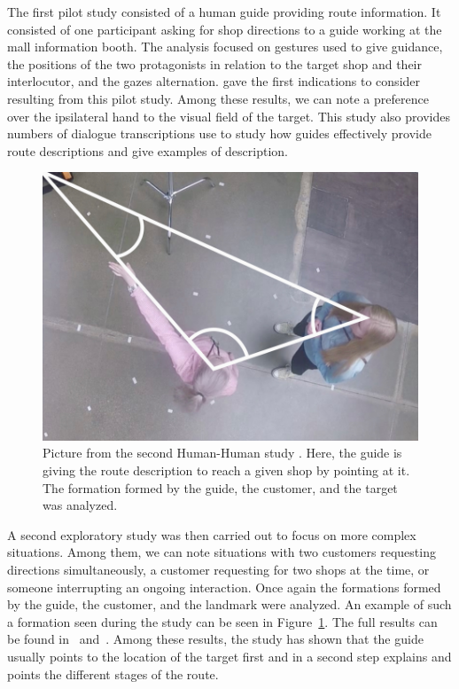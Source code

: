 The first pilot study consisted of a human guide providing route information. It consisted of one participant asking for shop directions to a guide working at the mall information booth. The analysis focused on gestures used to give guidance, the positions of the two protagonists in relation to the target shop and their interlocutor, and the gazes alternation. \cite{belhassein_2017_human} gave the first indications to consider resulting from this pilot study. Among these results, we can note a preference over the ipsilateral hand to the visual field of the target. This study also provides numbers of dialogue transcriptions use to study how guides effectively provide route descriptions and give examples of description.

\begin{figure}[ht!]
\centering
\includegraphics[scale=0.40]{figures/chapter8/human_guide.png}
\caption{\label{fig:chap8_human_guide} Picture from the second Human-Human study \cite{belhassein_2017_human}. Here, the guide is giving the route description to reach a given shop by pointing at it. The formation formed by the guide, the customer, and the target was analyzed. }
\end{figure}

A second exploratory study was then carried out to focus on more complex situations. Among them, we can note situations with two customers requesting directions simultaneously, a customer requesting for two shops at the time, or someone interrupting an ongoing interaction. Once again the formations formed by the guide, the customer, and the landmark were analyzed. An example of such a formation seen during the study can be seen in Figure~\ref{fig:chap8_human_guide}. The full results can be found in~\cite{Heikkilae_2018_where} and~\cite{heikkilae_2019_should}. Among these results, the study has shown that the guide usually points to the location of the target first and in a second step explains and points the different stages of the route.

